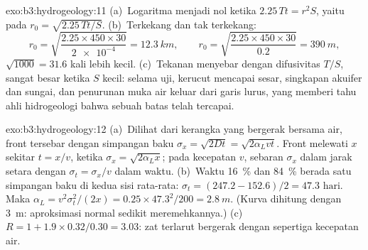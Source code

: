 \begin{solution}{exo:b3:hydrogeology:11}
(a)~Logaritma menjadi nol ketika $2.25\,Tt = r^2S$, yaitu pada $r_0 =
\sqrt{2.25\,Tt/S}$. (b)~Terkekang dan tak terkekang:
\[
r_0 = \sqrt{\frac{2.25\times450\times30}{\num{2e-4}}} = \qty{12.3}{km},
\qquad r_0 = \sqrt{\frac{2.25\times450\times30}{0.2}} = \qty{390}{m},
\]
$\sqrt{1000} = 31.6$ kali lebih kecil. (c)~Tekanan
menyebar dengan difusivitas $T/S$, sangat besar ketika $S$ kecil: selama
uji, kerucut mencapai sesar, singkapan akuifer dan sungai,
dan penurunan muka air keluar dari garis lurus, yang memberi tahu
ahli hidrogeologi bahwa sebuah batas telah tercapai.
\end{solution}

\begin{solution}{exo:b3:hydrogeology:12}
(a)~Dilihat dari kerangka yang bergerak bersama air, front tersebar dengan
simpangan baku $\sigma_x = \sqrt{2Dt} = \sqrt{2\alpha_Lvt}$. Front melewati
$x$ sekitar $t = x/v$, ketika $\sigma_x = \sqrt{2\alpha_Lx}$; pada kecepatan
$v$, sebaran $\sigma_x$ dalam jarak setara dengan $\sigma_t = \sigma_x/v$
dalam waktu. (b)~Waktu \qty{16}{\percent} dan \qty{84}{\percent} berada satu
simpangan baku di kedua sisi rata-rata: $\sigma_t = (247.2 -
152.6)/2 = \num{47.3}\text{ hari}$. Maka $\alpha_L = v^2\sigma_t^2/(2x) =
0.25\times47.3^2/200 = \qty{2.8}{m}$. (Kurva dihitung dengan
\qty{3}{m}: aproksimasi normal sedikit meremehkannya.) (c)~$R =
1 + 1.9\times0.32/0.30 = \num{3.03}$: zat terlarut bergerak dengan sepertiga
kecepatan air.
\end{solution}

